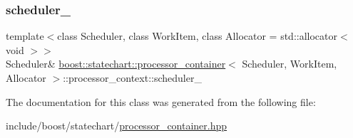 \mbox{\label{classboost_1_1statechart_1_1processor__container_1_1processor__context_ac3c7de353368f931c3dce4b074353bc6}} 
\subsubsection{\texorpdfstring{scheduler\+\_\+}{scheduler\_}}
{\footnotesize\ttfamily template$<$class Scheduler, class Work\+Item, class Allocator = std\+::allocator$<$ void $>$$>$ \\
Scheduler\& \mbox{\hyperlink{classboost_1_1statechart_1_1processor__container}{boost\+::statechart\+::processor\+\_\+container}}$<$ Scheduler, Work\+Item, Allocator $>$\+::processor\+\_\+context\+::scheduler\+\_\+\hspace{0.3cm}{\ttfamily [private]}}



The documentation for this class was generated from the following file\+:\begin{DoxyCompactItemize}
\item 
include/boost/statechart/\mbox{\hyperlink{processor__container_8hpp}{processor\+\_\+container.\+hpp}}\end{DoxyCompactItemize}

